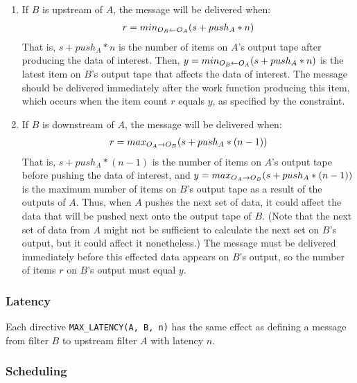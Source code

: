 \begin{enumerate}

\item If $B$ is upstream of $A$, the message will be delivered when:
\begin{eqnarray}
\label{eq:msgup}
r = min_{O_B \leftarrow O_A}(s + push_A * n)
\end{eqnarray}
That is, $s + push_A * n$ is the number of items on $A$'s output tape
after producing the data of interest.  Then, $y =
min_{O_B \leftarrow O_A}(s + push_A * n)$ is the latest item on $B$'s output
tape that affects the data of interest.  The message should be
delivered immediately after the work function producing this item,
which occurs when the item count $r$ equals $y$, as specified by the
constraint.

\item If $B$ is downstream of $A$, the message will be delivered when:
\begin{eqnarray}
\label{eq:msgdown}
r = max_{O_A \rightarrow O_B}(s + push_A * (n-1))
\end{eqnarray}
That is, $s + push_A * (n - 1)$ is the number of items on $A$'s
output tape before pushing the data of interest, and $y =
max_{O_A \rightarrow O_B}(s + push_A * (n-1))$ is the maximum number of items
on $B$'s output tape as a result of the outputs of $A$.  Thus, when
$A$ pushes the next set of data, it could affect the data that will be
pushed next onto the output tape of $B$.  (Note that the next set of
data from $A$ might not be sufficient to calculate the next set on
$B$'s output, but it could affect it nonetheless.)  The message must
be delivered immediately before this effected data appears on $B$'s
output, so the number of items $r$ on $B$'s output must equal $y$.

\end{enumerate}

\subsubsection{Latency}

Each directive {\tt MAX\_LATENCY(A, B, n)} has the same effect as
defining a message from filter $B$ to upstream filter $A$ with latency
$n$.

\subsubsection{Scheduling}

